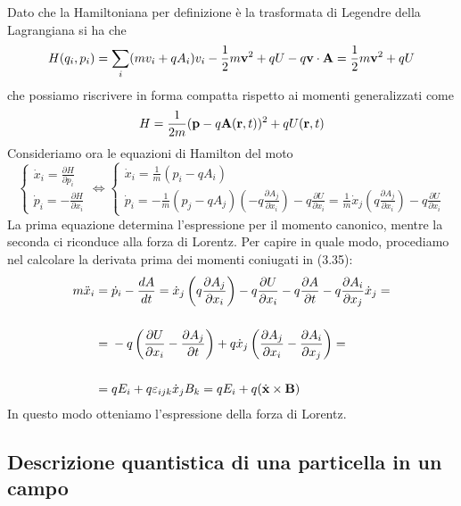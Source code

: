 Dato che la Hamiltoniana per definizione \`e la trasformata di Legendre della Lagrangiana si ha che
\begin{equation*}
	H(q_i,p_i) = \sum_{i}(mv_i + qA_i)v_i - \frac{1}{2}m\bold{v}^2+ qU - q \bold{v} \cdot \bold{A} =  \frac{1}{2}m\bold{v}^2 + qU 
\end{equation*}
che possiamo riscrivere in forma compatta rispetto ai momenti generalizzati come 
\begin{equation*}
	H = \frac{1}{2m}(\bold{p} - q \bold{A}(\bold{r},t))^2+ qU(\bold{r},t)
\end{equation*}
Consideriamo ora le equazioni di Hamilton del moto 
\begin{equation*}
	\left \{ \begin{array}{l}
		\dot{x}_i = \frac{\partial H }{\partial p_i} \\
		\dot{p}_i = -\frac{\partial H}{\partial x_i}
	\end{array}\right.
	\iff 
		\left \{ \begin{array}{l}
		\dot{x}_i = \frac{1}{m} (p_i - qA_i)\\
		\dot{p}_i = -\frac{1}{m}(p_j-qA_j)\left ( -q \frac{\partial A_j}{\partial x_i}\right)-q\frac{\partial U}{\partial x_i} = \frac{1}{m}\dot{x}_j \left (q \frac{\partial A_j}{\partial x_i} \right) - q \frac{\partial U}{\partial x_i}
	\end{array}\right.
\end{equation*}	
La prima equazione determina l'espressione per il momento canonico, mentre la seconda ci riconduce alla forza di Lorentz. Per capire in quale modo, procediamo nel calcolare la derivata prima dei momenti coniugati in (3.35):
\begin{align*}
	m\ddot{x}_i = & \; \dot{p}_i - \frac{d A}{d t} =  \dot{x}_j \left (q \frac{\partial A_j}{\partial x_i} \right) - q \frac{\partial U}{\partial x_i} - q \frac{\partial A}{\partial t} - q \frac{\partial A_i}{\partial x_j}\dot{x}_j = \\[0.5cm]
	= & \; - q \left ( \frac{\partial U}{\partial x_i} - \frac{\partial A_j}{\partial t} \right) + q \dot{x}_j \left (\frac{\partial A_j}{\partial x_i} - \frac{\partial A_i}{\partial x_j} \right) = \\[0.5cm]
	= & \; qE_i +q  \varepsilon_{ijk}\dot{x}_jB_k = qE_i + q (\dot{\bold{x}} \times \bold{B})
\end{align*}
In questo modo otteniamo l'espressione della forza di Lorentz.

\subsection{Descrizione quantistica di una particella in un campo}

